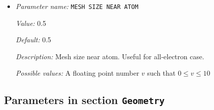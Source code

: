 \begin{itemize}
{\it Value:} 0.5


{\it Default:} 0.5


{\it Description:} Mesh size in a ball around atom


{\it Possible values:} A floating point number $v$ such that $0 \leq v \leq 10$
\item {\it Parameter name:} {\tt MESH SIZE NEAR ATOM}
\label{parameters:Finite element mesh parameters/Auto mesh generation parameters/MESH SIZE NEAR ATOM}
\label{parameters:Finite_20element_20mesh_20parameters/Auto_20mesh_20generation_20parameters/MESH_20SIZE_20NEAR_20ATOM}


{\it Value:} 0.5


{\it Default:} 0.5


{\it Description:} Mesh size near atom. Useful for all-electron case.


{\it Possible values:} A floating point number $v$ such that $0 \leq v \leq 10$
\end{itemize}

\subsection{Parameters in section \tt Geometry}
\label{parameters:Geometry}

